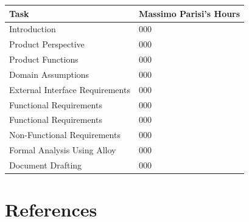 \documentclass{article}
\newcommand\xrowht[2][0]
{\addstackgap[.5\dimexpr#2\relax]{\vphantom{#1}}}
\renewcommand{\arraystretch}{1.6}
\begin{document}
	\begin{center}
		
		\renewcommand{\arraystretch}{1.2}
		
		\begin{tabular}[h!]{|m{14em}|m{12em}|}
			\rowcolor{gray!20}
			\hline
			\xrowht{5pt}
			\centering Task & Massimo Parisi's Hours \\
			\hline
			Introduction & 000 \\
			\hline
			Product Perspective & 000 \\
			\hline
			Product Functions & 000 \\
			\hline
			Domain Assumptions & 000 \\
			\hline
			External Interface Requirements & 000 \\
			\hline
			Functional Requirements & 000 \\
			\hline
			Functional Requirements & 000 \\
			\hline
			Non-Functional Requirements & 000 \\
			\hline
			Formal Analysis Using Alloy & 000 \\
			\hline
			Document Drafting & 000 \\
			\hline
		\end{tabular}
	\end{center}

\section{References}	

	
	
	
\end{document}
